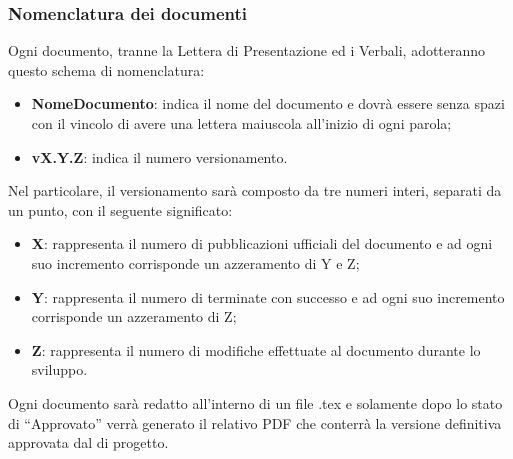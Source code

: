 \subsubsection{Nomenclatura dei documenti}
Ogni documento, tranne la Lettera di Presentazione ed i Verbali, adotteranno questo schema di nomenclatura:
\begin{itemize}
	\item \textbf{NomeDocumento}: indica il nome del documento e dovrà essere senza spazi con il vincolo di avere una lettera maiuscola all’inizio di ogni parola;
	\item \textbf{vX.Y.Z}: indica il numero versionamento.
\end{itemize}
Nel particolare, il versionamento sarà composto da tre numeri interi, separati da un punto, con il seguente significato:
\begin{itemize}
	\item \textbf{X}: rappresenta il numero di pubblicazioni ufficiali del documento e ad ogni suo incremento corrisponde un azzeramento di Y e Z;
	\item \textbf{Y}: rappresenta il numero di  terminate con successo e ad ogni suo incremento corrisponde un azzeramento di Z;
	\item \textbf{Z}: rappresenta il numero di modifiche effettuate al documento durante lo sviluppo.
\end{itemize}
Ogni documento sarà redatto all’interno di un file .tex e solamente dopo lo stato di “Approvato” verrà generato il relativo PDF che conterrà la versione definitiva approvata dal \emph{} di progetto.

